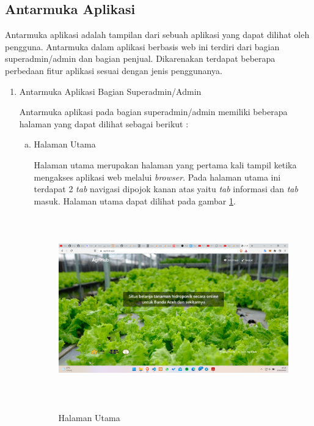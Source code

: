\subsection{Antarmuka Aplikasi}
Antarmuka aplikasi adalah tampilan dari sebuah aplikasi yang dapat dilihat oleh pengguna. Antarmuka dalam aplikasi berbasis web ini terdiri dari bagian superadmin/admin dan bagian penjual. Dikarenakan terdapat beberapa perbedaan fitur aplikasi sesuai dengan jenis penggunanya.

\begin{enumerate}
	\item Antarmuka Aplikasi Bagian Superadmin/Admin
	
	Antarmuka aplikasi pada bagian superadmin/admin memiliki beberapa halaman yang dapat dilihat sebagai berikut :

	\begin{enumerate}[a.]
		\item Halaman Utama
		\par Halaman utama merupakan halaman yang pertama kali tampil ketika mengakses aplikasi web melalui \textit{browser}. Pada halaman utama ini terdapat 2 \textit{tab} navigasi dipojok kanan atas yaitu \textit{tab} informasi dan \textit{tab} masuk. Halaman utama dapat dilihat pada gambar \ref*{homepage}.
		\begin{figure}[H]
			\centering
			{\includegraphics [width = 13.5cm, height= 8cm]{gambar/homepage}}
			\caption{Halaman Utama}
			\label{homepage}
		\end{figure}


\end{enumerate}
\end{enumerate}
